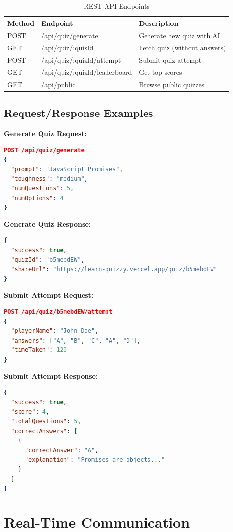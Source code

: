 \documentclass[12pt,a4paper]{article}
\begin{document}
\begin{table}[h]
\centering
\begin{tabular}{|l|l|p{6cm}|}
\hline
\textbf{Method} & \textbf{Endpoint} & \textbf{Description} \\
\hline
POST & /api/quiz/generate & Generate new quiz with AI \\
\hline
GET & /api/quiz/:quizId & Fetch quiz (without answers) \\
\hline
POST & /api/quiz/:quizId/attempt & Submit quiz attempt \\
\hline
GET & /api/quiz/:quizId/leaderboard & Get top scores \\
\hline
GET & /api/public & Browse public quizzes \\
\hline
\end{tabular}
\caption{REST API Endpoints}
\end{table}

\subsection{Request/Response Examples}

\textbf{Generate Quiz Request:}
\begin{lstlisting}[language=json]
POST /api/quiz/generate
{
  "prompt": "JavaScript Promises",
  "toughness": "medium",
  "numQuestions": 5,
  "numOptions": 4
}
\end{lstlisting}

\textbf{Generate Quiz Response:}
\begin{lstlisting}[language=json]
{
  "success": true,
  "quizId": "b5mebdEW",
  "shareUrl": "https://learn-quizzy.vercel.app/quiz/b5mebdEW"
}
\end{lstlisting}

\textbf{Submit Attempt Request:}
\begin{lstlisting}[language=json]
POST /api/quiz/b5mebdEW/attempt
{
  "playerName": "John Doe",
  "answers": ["A", "B", "C", "A", "D"],
  "timeTaken": 120
}
\end{lstlisting}

\textbf{Submit Attempt Response:}
\begin{lstlisting}[language=json]
{
  "success": true,
  "score": 4,
  "totalQuestions": 5,
  "correctAnswers": [
    {
      "correctAnswer": "A",
      "explanation": "Promises are objects..."
    }
  ]
}
\end{lstlisting}

\newpage

\section{Real-Time Communication}
\end{document}
